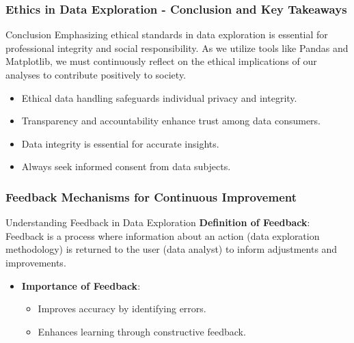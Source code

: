 \documentclass[aspectratio=169]{beamer}
\begin{document}
\begin{frame}[fragile]
    \frametitle{Ethics in Data Exploration - Conclusion and Key Takeaways}
    \begin{block}{Conclusion}
        Emphasizing ethical standards in data exploration is essential for professional integrity and social responsibility. As we utilize tools like Pandas and Matplotlib, we must continuously reflect on the ethical implications of our analyses to contribute positively to society.
    \end{block}

    \begin{itemize}
        \item Ethical data handling safeguards individual privacy and integrity.
        \item Transparency and accountability enhance trust among data consumers.
        \item Data integrity is essential for accurate insights.
        \item Always seek informed consent from data subjects.
    \end{itemize}
\end{frame}

\begin{frame}[fragile]
    \frametitle{Feedback Mechanisms for Continuous Improvement}
    \begin{block}{Understanding Feedback in Data Exploration}
        \textbf{Definition of Feedback}: Feedback is a process where information about an action (data exploration methodology) is returned to the user (data analyst) to inform adjustments and improvements.
    \end{block}
    \begin{itemize}
        \item \textbf{Importance of Feedback}:
        \begin{itemize}
            \item Improves accuracy by identifying errors.
            \item Enhances learning through constructive feedback.
        \end{itemize}
    \end{itemize}
\end{frame}
\end{document}
